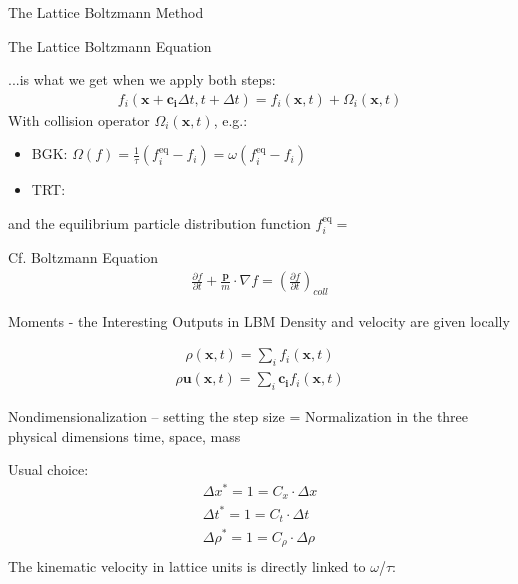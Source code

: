 \documentclass[aspectratio=43,t]{beamer}
\begin{document}
\begin{section}{The Lattice Boltzmann Method}
	
	\begin{frame}{The Lattice Boltzmann Equation}

			{...is what we get when we apply both steps:}
			\begin{align*}	
			f_i(\bm{x} + \bm{c_i}\Delta t, t + \Delta t) = f_i(\bm{x}, t) + \Omega_i(\bm{x}, t)
			\end{align*}
			\pause
			With collision operator $\Omega_i(\bm{x}, t)$, e.g.:
			\begin{itemize}
				\item BGK: $\Omega (f)={\frac {1}{\tau}}(f_{i}^{\text{eq}}-f_{i}) = \omega (f_{i}^{\text{eq}}-f_{i}) $
				\item TRT: %
			\end{itemize}
			\pause 
			and the equilibrium particle distribution function $f_{i}^{\text{eq}} = $	%
			\pause 
			\newline\par\smallskip
			{Cf. Boltzmann Equation}
			\begin{align*}%
				{{\frac {\partial f}{\partial t}}+{\frac {\bm {p} }{m}}\cdot \nabla f=\left({\frac {\partial f}{\partial t}}\right)_{ {coll} }}
			\end{align*}
	\end{frame}
	
	\begin{frame}{Moments - the Interesting Outputs in LBM}
		Density and velocity are given locally
		
		\begin{align*}
		\rho(\bm{x}, t) = \sum_i f_i(\bm{x},t)
		\end{align*}
		\begin{align*}
		\rho \bm{u}(\bm{x}, t) = \sum_i \bm{c_i} f_i(\bm{x},t)
		\end{align*}
	\end{frame}
	
	\begin{frame}{Nondimensionalization -- setting the step size}
		= Normalization in the three physical dimensions time, space, mass \newline
		\par\bigskip
		\pause
		Usual choice:
		\begin{align*}
		\Delta x^*  = 1 = C_x \cdot \Delta x\\ 
		\Delta t^* = 1 = C_t \cdot \Delta t\\ 
		\Delta \rho^* = 1 = C_\rho \cdot \Delta \rho\\ 
		\end{align*}
		\pause
		The kinematic velocity in lattice units is directly linked to $\omega$/$\tau$: %
	\end{frame}
	
\end{section}
\end{document}
